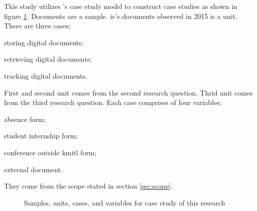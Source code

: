 This study utilizes \citeauthor{merriam1988case}'s case study model to construct case studies as shown in figure \ref{fig:our-case-study-method}.
Documents are a sample.
\gls{ic}'s documents observed in 2015 is a unit.
There are three cases;
\begin{enumerate*}
	\item storing digital documents;
	\item retrieving digital documents;
	\item tracking digital documents.
\end{enumerate*}
First and second unit comes from the second research question.
Thrid unit comes from the third research question.
Each case comprises of four variables;
\begin{enumerate*}
	\item absence form;
	\item student internship form;
	\item conference outside \gls{kmitl} form;
	\item external document.
\end{enumerate*}
They come from the scope stated in section \ref{sec:scope}.

\begin{figure}[h!]
	\centering
	\caption{Samples, units, cases, and variables for case study of this research}
	\label{fig:our-case-study-method}
	\begin{minipage}{8cm}
	\end{minipage}
\end{figure}

